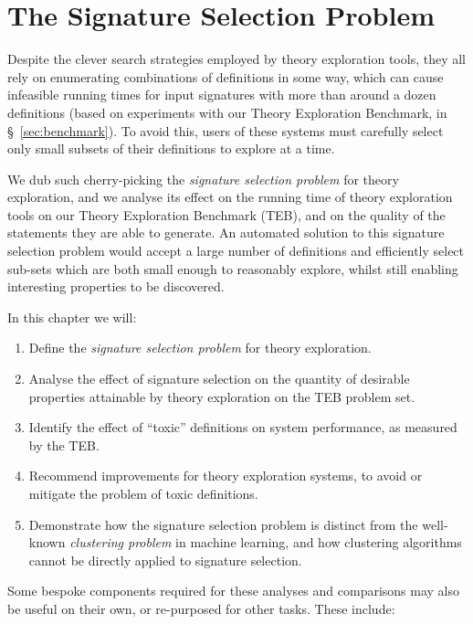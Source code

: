 \chapter{The Signature Selection Problem}
\label{sec:signatureselection}

Despite the clever search strategies employed by theory exploration tools, they
all rely on enumerating combinations of definitions in some way, which can cause
infeasible running times for input signatures with more than around a dozen
definitions (based on experiments with our Theory Exploration Benchmark, in
\S~\ref{sec:benchmark}). To avoid this, users of these systems must carefully
select only small subsets of their definitions to explore at a time.

We dub such cherry-picking the \emph{signature selection problem} for theory
exploration, and we analyse its effect on the running time of theory exploration
tools on our Theory Exploration Benchmark (TEB), and on the quality of the
statements they are able to generate. An automated solution to this signature
selection problem would accept a large number of definitions and efficiently
select sub-sets which are both small enough to reasonably explore, whilst still
enabling interesting properties to be discovered.

In this chapter we will:

\begin{enumerate}
\item Define the \emph{signature selection problem} for theory exploration.
\item Analyse the effect of signature selection on the quantity of desirable
  properties attainable by theory exploration on the TEB problem set.
\item Identify the effect of ``toxic'' definitions on system performance, as
  measured by the TEB.
\item Recommend improvements for theory exploration systems, to avoid or
  mitigate the problem of toxic definitions.
\item Demonstrate how the signature selection problem is distinct from the
  well-known \emph{clustering problem} in machine learning, and how clustering
  algorithms cannot be directly applied to signature selection.
\end{enumerate}

\iffalse
Some bespoke components required for these analyses and comparisons may also be
useful on their own, or re-purposed for other tasks. These include:

